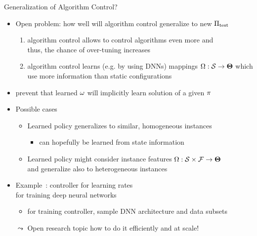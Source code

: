 \begin{frame}[c]{Generalization of Algorithm Control?}

\begin{itemize}
  \item Open problem: how well will algorithm control generalize to new $\Pi_{\text{test}}$
  \begin{enumerate}
    \item algorithm control allows to control algorithms even more and\\ thus, the chance of over-tuning increases
    \pause
    \item algorithm control learns (e.g. by using DNNs) mappings $\Omega: \mathcal{S} \to \mathbf{\Theta}$ which use more information than static configurations
  \end{enumerate}
  \pause
  \item prevent that learned $\omega$ will implicitly learn solution of a given $\pi$ 
  \pause
  \medskip
  \item Possible cases
  \begin{itemize}
    \item Learned policy generalizes to similar, homogeneous instances
    \begin{itemize}
      \item can hopefully be learned from state information
    \end{itemize}
    \item Learned policy might consider instance features $\Omega: \mathcal{S} \times \mathcal{F} \to \mathbf{\Theta}$\\ and generalize also to heterogeneous instances
  \end{itemize}  
  \pause
  \item Example~:  controller for learning rates\\ for training deep neural networks
  \begin{itemize}
    \item for training controller, sample DNN architecture and data subsets 
  \end{itemize}
  \pause
  \item[$\leadsto$] Open research topic how to do it efficiently and at scale!
\end{itemize}

\end{frame}
